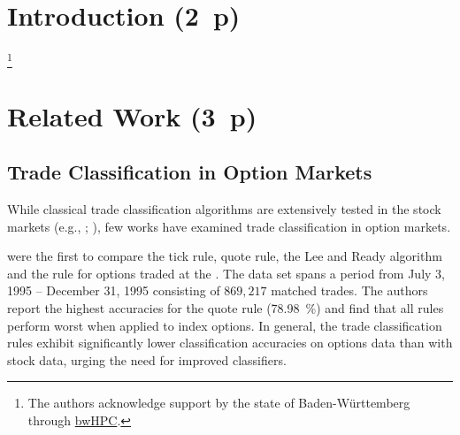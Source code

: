 \section{Introduction (2~p)}\label{sec:introduction}

\footnote{The authors acknowledge support by the state of Baden-Württemberg through \href{https://www.bwhpc.de/}{bwHPC}.}
\newpage

\section{Related Work (3~p)}\label{sec:related-work}

\subsection{Trade Classification in Option Markets}
\label{sec:trade-classification-in-option-markets}

While classical trade classification algorithms are extensively tested in the stock markets (e.g., \textcite[][3806--3821]{chakrabartyTradeClassificationAlgorithms2012}; \textcite[][259--286]{odders-whiteOccurrenceConsequencesInaccurate2000}), few works have examined trade classification in option markets.

\textcite[882--883]{savickasInferringDirectionOption2003} were the first to compare the tick rule, quote rule, the Lee and Ready algorithm and the  rule for options traded at the . The data set spans a period from July 3, 1995 -- December 31, 1995 consisting of $869{,}217$ matched trades. The authors report the highest accuracies for the quote rule (\SI{78.98}{\percent}) and find that all rules perform worst when applied to index options. In general, the trade classification rules exhibit significantly lower classification accuracies on options data than with stock data, urging the need for improved classifiers.

